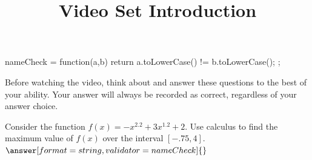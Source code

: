 \documentclass[handout]{ximera}
\title{Video Set Introduction}
\begin{document}
\begin{abstract}
\end{abstract}


\maketitle


\begin{javascript}
  nameCheck = function(a,b) {
    return a.toLowerCase() != b.toLowerCase();
  };
\end{javascript}

Before watching the video, think about and answer these questions to the best of your ability. Your answer will always be recorded as correct, regardless of your answer choice.

\begin{problem}
Consider the function $f(x) = -x^{2.2}+3x^{1.2}+2$. Use calculus to find the maximum value of $f(x)$ over the interval $[-.75,4]$.
$\answer[format=string,validator=nameCheck]{}$
\end{problem}
\end{document}
